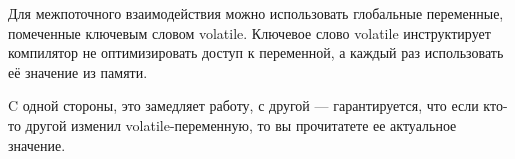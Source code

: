 Для межпоточного взаимодействия можно использовать глобальные переменные, помеченные ключевым словом volatile. Ключевое слово volatile инструктирует компилятор не оптимизировать доступ к переменной, а каждый раз использовать её значение из памяти.

C одной стороны, это замедляет работу, с другой --- гарантируется, что если кто-то другой изменил volatile-переменную, то вы прочитатете ее актуальное значение.